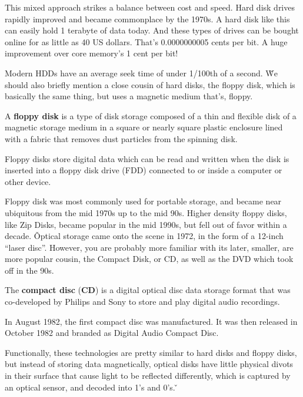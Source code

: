 This mixed approach strikes a balance between cost and speed. Hard disk drives rapidly improved and became
commonplace by the 1970s. A hard disk like this can easily hold 1 terabyte of data today. And these types of drives
can be bought online for as little as 40 US dollars. That's 0.0000000005 cents per bit. A huge improvement over core
memory's 1 cent per bit!
\ee

Modern HDDs have an average seek time of under 1/100th of a second. \v

We should also briefly mention a close cousin of hard disks, the floppy disk, which is basically the same thing, but
uses a magnetic medium that's, floppy.

A \textbf{floppy disk} is a type of disk storage composed of a thin and flexible disk of a magnetic storage medium in
a square or nearly square plastic enclosure lined with a fabric that removes dust particles from the spinning disk.
\ed

Floppy disks store digital data which can be read and written when the disk is inserted into a floppy disk drive
(FDD) connected to or inside a computer or other device.


Floppy disk was most commonly used for portable storage, and became near ubiquitous from the mid 1970s up to the mid
90s. Higher density floppy disks, like Zip Disks, became popular in the mid 1990s, but fell out of favor within a
decade. \v

Optical storage came onto the scene in 1972, in the form of a 12-inch ``laser disc''. However, you are probably more
familiar with its later, smaller, are more popular cousin, the Compact Disk, or CD, as well as the DVD which took off
in the 90s.

The \textbf{compact disc} (\textbf{CD}) is a digital optical disc data storage format that was co-developed by
Philips and Sony to store and play digital audio recordings.
\ed

In August 1982, the first compact disc was manufactured. It was then released in October 1982 and branded as Digital
Audio Compact Disc.


Functionally, these technologies are pretty similar to hard disks and floppy disks, but instead of storing data
magnetically, optical disks have little physical divots in their surface that cause light to be reflected
differently, which is captured by an optical sensor, and decoded into 1's and 0's. \v

